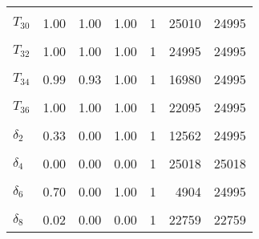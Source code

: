 \begin{longtable}[t]{lrrrrrr}
\cellcolor{gray!6}{$T_{29}$} & \cellcolor{gray!6}{0.99} & \cellcolor{gray!6}{0.94} & \cellcolor{gray!6}{1.00} & \cellcolor{gray!6}{1} & \cellcolor{gray!6}{21176} & \cellcolor{gray!6}{24995}\\
$T_{30}$ & 1.00 & 1.00 & 1.00 & 1 & 25010 & 24995\\
\cellcolor{gray!6}{$T_{31}$} & \cellcolor{gray!6}{0.88} & \cellcolor{gray!6}{0.65} & \cellcolor{gray!6}{1.00} & \cellcolor{gray!6}{1} & \cellcolor{gray!6}{3612} & \cellcolor{gray!6}{24995}\\
$T_{32}$ & 1.00 & 1.00 & 1.00 & 1 & 24995 & 24995\\
\cellcolor{gray!6}{$T_{33}$} & \cellcolor{gray!6}{1.00} & \cellcolor{gray!6}{1.00} & \cellcolor{gray!6}{1.00} & \cellcolor{gray!6}{1} & \cellcolor{gray!6}{24099} & \cellcolor{gray!6}{24995}\\
$T_{34}$ & 0.99 & 0.93 & 1.00 & 1 & 16980 & 24995\\
\cellcolor{gray!6}{$T_{35}$} & \cellcolor{gray!6}{1.00} & \cellcolor{gray!6}{1.00} & \cellcolor{gray!6}{1.00} & \cellcolor{gray!6}{1} & \cellcolor{gray!6}{24995} & \cellcolor{gray!6}{24995}\\
$T_{36}$ & 1.00 & 1.00 & 1.00 & 1 & 22095 & 24995\\
\cellcolor{gray!6}{$\delta_{1}$} & \cellcolor{gray!6}{0.00} & \cellcolor{gray!6}{0.00} & \cellcolor{gray!6}{0.00} & \cellcolor{gray!6}{1} & \cellcolor{gray!6}{25014} & \cellcolor{gray!6}{25014}\\
$\delta_{2}$ & 0.33 & 0.00 & 1.00 & 1 & 12562 & 24995\\
\cellcolor{gray!6}{$\delta_{3}$} & \cellcolor{gray!6}{0.16} & \cellcolor{gray!6}{0.00} & \cellcolor{gray!6}{1.00} & \cellcolor{gray!6}{1} & \cellcolor{gray!6}{10970} & \cellcolor{gray!6}{24995}\\
$\delta_{4}$ & 0.00 & 0.00 & 0.00 & 1 & 25018 & 25018\\
\cellcolor{gray!6}{$\delta_{5}$} & \cellcolor{gray!6}{0.00} & \cellcolor{gray!6}{0.00} & \cellcolor{gray!6}{0.00} & \cellcolor{gray!6}{1} & \cellcolor{gray!6}{24995} & \cellcolor{gray!6}{24995}\\
$\delta_{6}$ & 0.70 & 0.00 & 1.00 & 1 & 4904 & 24995\\
\cellcolor{gray!6}{$\delta_{7}$} & \cellcolor{gray!6}{0.06} & \cellcolor{gray!6}{0.00} & \cellcolor{gray!6}{1.00} & \cellcolor{gray!6}{1} & \cellcolor{gray!6}{16319} & \cellcolor{gray!6}{24995}\\
$\delta_{8}$ & 0.02 & 0.00 & 0.00 & 1 & 22759 & 22759\\

\end{longtable}
